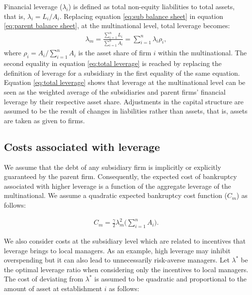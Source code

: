 \documentclass[12pt]{article}
\begin{document}
	Financial leverage ($\lambda_i$) is defined as total non-equity liabilities to total assets, that is, $\lambda_i=L_i/A_i$. Replacing equation \ref{eq:sub balance sheet} in equation \ref{eq:parent balance sheet}, at the multinational level, total leverage becomes:
	\begin{equation}
	\begin{aligned}
	\lambda_m=\frac{\sum_{i=1}^{n}L_i}{\sum_{i=1}^{n}A_i}=\sum_{i=1}^{n}\lambda_i\rho_i, 
	\end{aligned}
	\label{eq:total leverage}
	\end{equation} 
	where $\rho_i=A_i/\sum_{i=1}^{n}A_i$ is the asset share of firm $i$ within the multinational. The second equality in equation \ref{eq:total leverage} is reached by replacing the definition of leverage for a subsidiary in the first equality of the same equation. Equation \ref{eq:total leverage} shows that leverage at the multinational level can be seen as the weighted average of the subsidiaries and parent firms' financial leverage by their respective asset share. Adjustments in the capital structure are assumed to be the result of changes in liabilities rather than assets, that is, assets are taken as given to firms. 
	
	\subsection{Costs associated with leverage}
	\label{subsec:costs}
	We assume that the debt of any subsidiary firm is implicitly or explicitly guaranteed by the parent firm. Consequently, the expected cost of bankruptcy associated with higher leverage is  a function of the aggregate leverage of the multinational. We assume a quadratic expected bankruptcy cost function ($C_m$) as follows:
	
	\begin{equation}
	\begin{aligned}
	C_m=\frac{\gamma}{2}\lambda_m^2\bigg(\sum_{i=1}^{n}A_i\bigg).
	\end{aligned}
	\label{eq:cost bankruptcy}
	\end{equation}
	
	We also consider costs at the subsidiary level which are related to incentives that leverage brings to local managers. As an example, high leverage may inhibit overspending but it can also lead to unnecessarily risk-averse managers. Let $\lambda^*$ be the optimal leverage ratio when considering only the incentives to local managers. The cost of deviating from $\lambda^*$ is assumed to be quadratic and proportional to the amount of asset at establishment $i$ as follows:  
	
\end{document}

